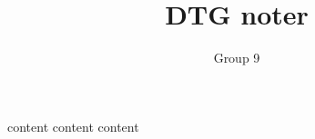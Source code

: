 \documentclass[11pt,oneside]{book}
\title{DTG noter}
\author{Group 9}
\begin{document}
\maketitle

\tableofcontents

{content}
{content}
{content}
\end{document}
